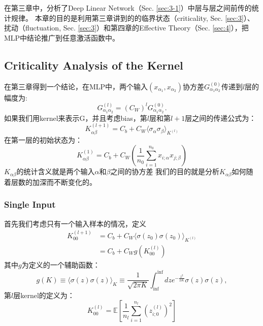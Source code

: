 在第三章中，分析了Deep Linear Network（Sec. \ref{sec:3-1}）中层与层之间前传的统计规律。
本章的目的是利用第三章讲到的的临界状态（criticality, Sec. \ref{sec:3}）、扰动（fluctuation, Sec. \ref{sec:3}）和第四章的Effective Theory（Sec. \ref{sec:4}），把MLP中结论推广到任意激活函数中。

\subsection{Criticality Analysis of the Kernel}
在第三章得到一个结论，在MLP中，两个输入$(x_{\alpha_1}, x_{\alpha_2})$协方差$G_{\alpha_1\alpha_2}^{(0)}$传递到$l$层的幅度为:
\begin{equation}
    G_{\alpha_1\alpha_2}^{(l)} = (C_W)^l G_{\alpha_1\alpha_2}^{(0)}.
\end{equation} 
如果我们用kernel来表示G，并且考虑bias，第$l$层和第$l+1$层之间的传递公式为：
\begin{equation}
    K_{\alpha\beta}^{(l+1)} = C_b + C_W\langle\sigma_\alpha \sigma_\beta\rangle_{K^{(l)}}
    \label{eq:kernel_recursion}
\end{equation} 
在第一层的初始状态为：
\begin{equation}
    K_{\alpha\beta}^{(1)} = C_b + C_W(\frac{1}{n_0}\sum^{n_0}_{i=1}x_{i;\alpha}x_{j;\beta})
\end{equation}
$K_{\alpha\beta}$的统计含义就是两个输入$\alpha$和$\beta$之间的协方差
我们的目的就是分析$K_{\alpha\beta}$如何随着层数的加深而不断变化的。

\subsubsection{Single Input}
首先我们考虑只有一个输入样本的情况，定义
\begin{equation}
    \begin{aligned}
    K_{00}^{(l+1)} &= C_b + C_W\langle\sigma(z_0)\sigma(z_0)\rangle_{K^{(l)}} \\
    &= C_b + C_Wg(K_{00}^{(l)})
    \end{aligned}
\label{eq:4-1-1}
\end{equation}
其中$g$为定义的一个辅助函数：
\begin{equation}
    g(K)\equiv \langle\sigma(z)\sigma(z)\rangle_{K} \equiv \frac{1}{\sqrt{2\pi K}}\int^{\inf}_{\inf}dz e^{-\frac{z^2}{2K}}\sigma(z)\sigma(z),
\end{equation}
第$l$层kernel的定义为：
\begin{equation}
    K_{00}^{(l)} = \mathbb{E}[\frac{1}{n_{l}}\sum^{n_{l}}_{i=1}(z^{(l)}_{i;0})^2]
\end{equation}

